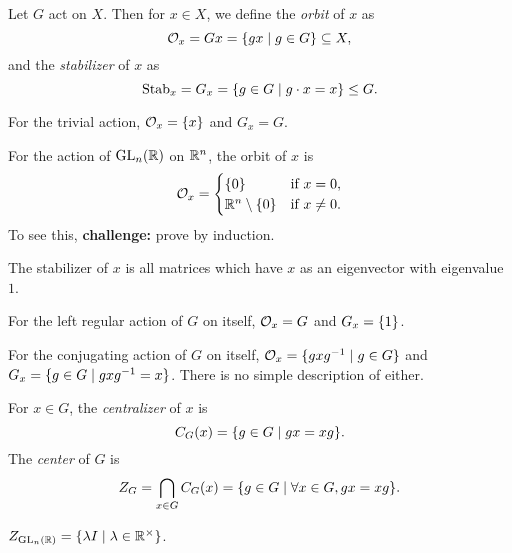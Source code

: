 \begin{definition} \label{def:orbit}
    Let $G$ act on $X$.
    Then for $x \in X$, we define the \emph{orbit} of $x$ as \[
        \mathcal{O}_x = G x = \{g x \mid g \in G\} \subseteq X,
    \] and the \emph{stabilizer} of $x$ as \[
        \operatorname{Stab}_x = G_x = \{g \in G \mid g \cdot x = x\} \le G.
    \]
\end{definition}
\begin{examples}
    \item For the trivial action, $\mathcal{O}_x = \{x\}$ and $G_x = G$.
    \item For the action of $\operatorname{GL}_n(\mathbb{R})$ on $\mathbb{R}^n$, the orbit of $x$ is \[
        \mathcal{O}_x = \begin{cases}
            \{0\} & \text{if } x = 0, \\
            \mathbb{R}^n \setminus \{0\} & \text{if } x \ne 0.
        \end{cases}
    \] To see this, \textbf{challenge:} prove by induction.

    The stabilizer of $x$ is all matrices which have $x$ as an eigenvector
    with eigenvalue $1$.
    \item For the left regular action of $G$ on itself,
        $\mathcal{O}_x = G$ and $G_x = \{1\}$.
    \item For the conjugating action of $G$ on itself,
        $\mathcal{O}_x = \{gxg^{-1} \mid g \in G\}$ and
        $G_x = \{g \in G \mid gxg^{-1} = x\}$.
        There is no simple description of either.
\end{examples}

\begin{definition} \label{def:center}
    For $x \in G$, the \emph{centralizer} of $x$ is \[
        C_G(x) = \{g \in G \mid gx = xg\}.
    \] The \emph{center} of $G$ is \[
        Z_G = \bigcap_{x \in G} C_G(x)
            = \{g \in G \mid \forall x \in G, gx = xg\}.
    \]
\end{definition}
\begin{example}
    $Z_{\operatorname{GL}_n(\mathbb{R})} = \{\lambda I \mid \lambda \in \mathbb{R}^\times\}$.
\end{example}

